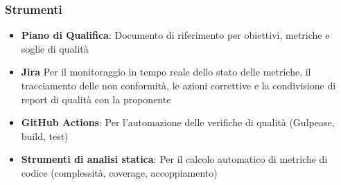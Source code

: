 \documentclass[a4paper,12pt]{article}
\begin{document}
\subsubsection{Strumenti}\label{strumenti_gestione_qualita}
\begin{itemize}
    \item \textbf{Piano di Qualifica}: Documento di riferimento per obiettivi, metriche e soglie di qualità
    \item \textbf{Jira} Per il monitoraggio in tempo reale dello stato delle metriche,
          il tracciamento delle non conformità, le azioni correttive e la condivisione di report di qualità con la proponente
    \item \textbf{GitHub Actions}: Per l'automazione delle verifiche di qualità (Gulpease, build, test)
    \item \textbf{Strumenti di analisi statica}: Per il calcolo automatico di metriche di codice (complessità, coverage, accoppiamento)
\end{itemize}
\end{document}
